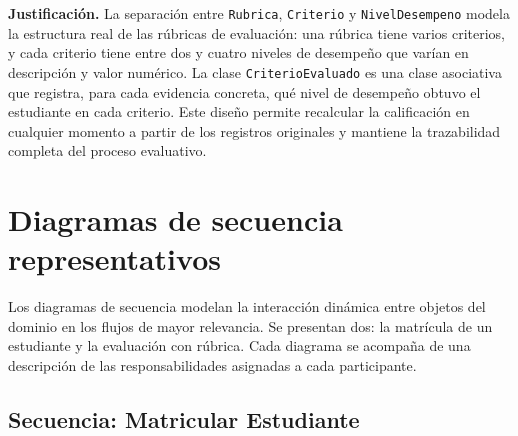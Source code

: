 \textbf{Justificación.} La separación entre \texttt{Rubrica},
\texttt{Criterio} y \texttt{NivelDesempeno} modela la estructura real
de las rúbricas de evaluación: una rúbrica tiene varios criterios, y
cada criterio tiene entre dos y cuatro niveles de desempeño que varían
en descripción y valor numérico. La clase \texttt{CriterioEvaluado} es
una clase asociativa que registra, para cada evidencia concreta, qué nivel
de desempeño obtuvo el estudiante en cada criterio. Este diseño permite
recalcular la calificación en cualquier momento a partir de los registros
originales y mantiene la trazabilidad completa del proceso evaluativo.

\section{Diagramas de secuencia representativos}
\label{sec:secuencia}

Los diagramas de secuencia modelan la interacción dinámica entre objetos
del dominio en los flujos de mayor relevancia. Se presentan dos: la
matrícula de un estudiante y la evaluación con rúbrica. Cada diagrama
se acompaña de una descripción de las responsabilidades asignadas a
cada participante.

\subsection*{Secuencia: Matricular Estudiante}

